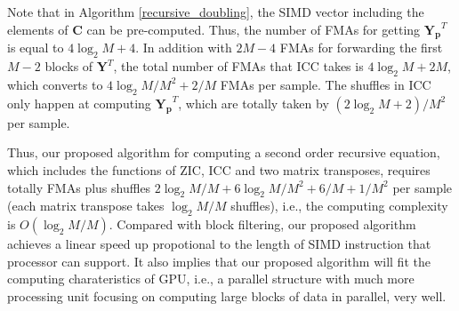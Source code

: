 

Note that in Algorithm \ref{recursive_doubling}, the SIMD vector including the ele\-ments of $\bm{C}$ can be pre-computed.
Thus, the number of FMAs for getting $\bm{Y_p}^T$ is equal to $4\log_2M{+}4$.
In addition with $2M{-}4$ FMAs for forwarding the first $M{-}2$ blocks of $\bm{Y}^T$,
the total number of FMAs that ICC takes is $4\log_2M{+}2M$,
which con\-verts to $4\log_2M/M^2{+}2/M$ FMAs per sample.
The shuffles in ICC only happen at computing $\bm{Y_p}^T$,
which are totally taken by $(2\log_2M{+}2)/M^2$ per sample.

Thus, our proposed algorithm for computing a second order recursive equation, which includes the functions of ZIC,
ICC and two matrix transposes, requires totally FMAs plus shuffles 
$2\log_2M/M{+}6\log_2M/M^2{+}6/M{+}1/M^2$ per sample (each matrix
transpose takes $\log_2M/M$ shuffles), i.e., the computing complexity is $O(\log_2M/M)$.
Compared with block filtering, our proposed algorithm
achieves a linear speed up propotional to the length of SIMD instruction that processor can support.
It also implies that our proposed algorithm will fit the computing 
charateristics of GPU, i.e., a parallel structure with much more processing unit focusing on
computing large blocks of data in parallel, very well.






